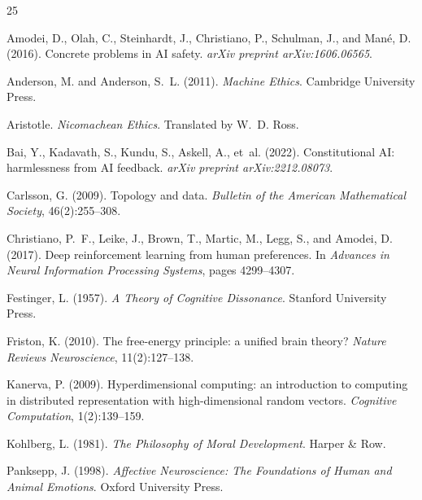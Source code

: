 \documentclass[11pt,a4paper]{article}
\begin{document}

\begin{thebibliography}{25}

Amodei, D., Olah, C., Steinhardt, J., Christiano, P., Schulman, J., and Man{\'e}, D. (2016).
\newblock Concrete problems in AI safety.
\newblock \emph{arXiv preprint arXiv:1606.06565}.

Anderson, M. and Anderson, S.~L. (2011).
\newblock \emph{Machine Ethics}.
\newblock Cambridge University Press.

Aristotle.
\newblock \emph{Nicomachean Ethics}.
\newblock Translated by W.~D. Ross.

Bai, Y., Kadavath, S., Kundu, S., Askell, A., et~al. (2022).
\newblock Constitutional AI: harmlessness from AI feedback.
\newblock \emph{arXiv preprint arXiv:2212.08073}.

Carlsson, G. (2009).
\newblock Topology and data.
\newblock \emph{Bulletin of the American Mathematical Society}, 46(2):255--308.

Christiano, P.~F., Leike, J., Brown, T., Martic, M., Legg, S., and Amodei, D. (2017).
\newblock Deep reinforcement learning from human preferences.
\newblock In \emph{Advances in Neural Information Processing Systems}, pages 4299--4307.

Festinger, L. (1957).
\newblock \emph{A Theory of Cognitive Dissonance}.
\newblock Stanford University Press.

Friston, K. (2010).
\newblock The free-energy principle: a unified brain theory?
\newblock \emph{Nature Reviews Neuroscience}, 11(2):127--138.

Kanerva, P. (2009).
\newblock Hyperdimensional computing: an introduction to computing in distributed representation with high-dimensional random vectors.
\newblock \emph{Cognitive Computation}, 1(2):139--159.

Kohlberg, L. (1981).
\newblock \emph{The Philosophy of Moral Development}.
\newblock Harper \& Row.

Panksepp, J. (1998).
\newblock \emph{Affective Neuroscience: The Foundations of Human and Animal Emotions}.
\newblock Oxford University Press.


\end{thebibliography}
\end{document}
